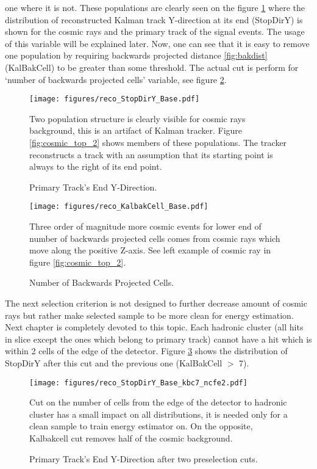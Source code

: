 one where it is not. These populations are clearly seen on the figure \ref{fig:stopdiry_1} where the distribution
of reconstructed Kalman track Y-direction at its end (StopDirY) is shown for the cosmic rays and the primary 
track of the signal events. The usage of this variable will be explained later. Now, one can see that it 
is easy to remove one population by requiring backwards projected distance \ref{fig:bakdist} (KalBakCell) to 
be greater than some threshold. The actual cut is perform for `number of backwards projected cells' variable, 
see figure \ref{fig:kalbakcell}.
\begin{figure}[h]
\centering
\texttt{[image: figures/reco\_StopDirY\_Base.pdf]}
\caption{Primary Track's End Y-Direction.}
{Two population structure is clearly visible for cosmic rays background, this is an artifact of Kalman tracker.
Figure \ref{fig:cosmic_top_2} shows members of these populations. The tracker reconstructs a track with an assumption 
that its starting point is always to the right of its end point. }
\label{fig:stopdiry_1}
\end{figure}
\begin{figure}[h]
\centering
\texttt{[image: figures/reco\_KalbakCell\_Base.pdf]}
\caption{Number of Backwards Projected Cells.}
{Three order of magnitude more cosmic events for lower end of number of backwards projected cells comes from cosmic 
rays which move along the positive Z-axis. See left example of cosmic ray in figure \ref{fig:cosmic_top_2}. }
\label{fig:kalbakcell}
\end{figure}

The next selection criterion is not designed to further decrease amount of cosmic rays but rather make selected sample 
to be more clean for energy estimation. Next chapter is completely devoted to this topic. Each
hadronic cluster (all hits in slice except the ones which belong to primary track) cannot have a hit which is within
2 cells of the edge of the detector. Figure \ref{fig:stopdiry_2} shows the
distribution of StopDirY after this cut and the previous one (KalBakCell $>$ 7).
\begin{figure}[h]
\centering
\texttt{[image: figures/reco\_StopDirY\_Base\_kbc7\_ncfe2.pdf]}
\caption{Primary Track's End Y-Direction after two preselection cuts.}
{Cut on the number of cells from the edge of the detector to hadronic cluster has a small impact on all distributions, 
it is needed only for a clean sample to train energy estimator on. On the opposite, Kalbakcell cut removes half of 
the cosmic background. }
\label{fig:stopdiry_2}
\end{figure} 

